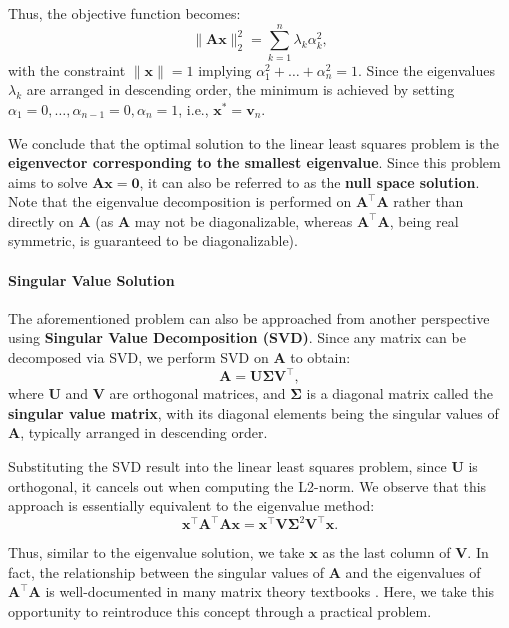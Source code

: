 Thus, the objective function becomes:
\begin{equation}\label{key}
	\| \bm{A} \bm{x} \|_2^2 = \sum_{k=1}^{n} \lambda_k \alpha_k^2,
\end{equation}
with the constraint $\| \bm{x} \| = 1$ implying $\alpha_1^2 + \ldots + \alpha_n^2 = 1$. Since the eigenvalues $\lambda_k$ are arranged in descending order, the minimum is achieved by setting $\alpha_1 = 0, \ldots, \alpha_{n-1} = 0, \alpha_n = 1$, i.e., $\bm{x}^* = \bm{v}_n$.

We conclude that the optimal solution to the linear least squares problem is the \textbf{eigenvector corresponding to the smallest eigenvalue}. Since this problem aims to solve $\bm{A} \bm{x} = \bm{0}$, it can also be referred to as the \textbf{null space solution}. Note that the eigenvalue decomposition is performed on $\bm{A}^\top \bm{A}$ rather than directly on $\bm{A}$ (as $\bm{A}$ may not be diagonalizable, whereas $\bm{A}^\top \bm{A}$, being real symmetric, is guaranteed to be diagonalizable).

\paragraph{Singular Value Solution}
The aforementioned problem can also be approached from another perspective using \textbf{Singular Value Decomposition (SVD)}. Since any matrix can be decomposed via SVD, we perform SVD on $\bm{A}$ to obtain:
\begin{equation}\label{key}
	\bm{A} = \bm{U} \boldsymbol{\Sigma} \bm{V}^\top,
\end{equation}
where $\bm{U}$ and $\bm{V}$ are orthogonal matrices, and $\boldsymbol{\Sigma}$ is a diagonal matrix called the \textbf{singular value matrix}, with its diagonal elements being the singular values of $\bm{A}$, typically arranged in descending order.  

Substituting the SVD result into the linear least squares problem, since $\bm{U}$ is orthogonal, it cancels out when computing the L2-norm. We observe that this approach is essentially equivalent to the eigenvalue method:
\begin{equation}\label{key}
	\bm{x}^\top \bm{A}^\top \bm{A} \bm{x} = \bm{x}^\top \bm{V} 
	\boldsymbol{\Sigma}^2 \bm{V}^\top \bm{x}.
\end{equation}

Thus, similar to the eigenvalue solution, we take $\bm{x}$ as the last column of $\bm{V}$. In fact, the relationship between the singular values of $\bm{A}$ and the eigenvalues of $\bm{A}^\top\bm{A}$ is well-documented in many matrix theory textbooks \cite{Magnus1998, ZhangXianDa2004}. Here, we take this opportunity to reintroduce this concept through a practical problem.  

